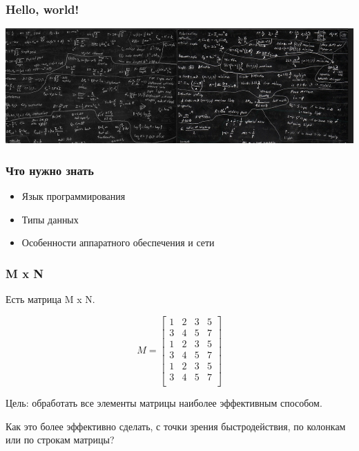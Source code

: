 \documentclass[10pt,pdf,hyperref={unicode}]{beamer}
\begin{document}
\begin{frame}
\frametitle{ Hello, world! }
	\center
		\includegraphics[width=1.0\textwidth]{./haskell.png}		
\end{frame}

\begin{frame}
\frametitle{ Что нужно знать}

\begin{itemize}

	\item Язык программирования
	\item Типы данных
	\item  Особенности аппаратного обеспечения и сети

\end{itemize}

\end{frame}

\begin{frame}
\frametitle{ M x N }

\par
Есть матрица M x N. 

\par
\[
  M=
  \left[ {\begin{array}{ccccc}
   1 & 2 & 3 & 5\\
   3 & 4 & 5 & 7\\
   1 & 2 & 3 & 5\\
   3 & 4 & 5 & 7\\
   1 & 2 & 3 & 5\\
   3 & 4 & 5 & 7\\
  \end{array} } \right]
\]

\par
Цель: обработать все элементы матрицы наиболее эффективным способом.

\par
Как это более эффективно сделать, с точки зрения быстродействия, по колонкам или по строкам матрицы?

\end{frame}
\end{document}
